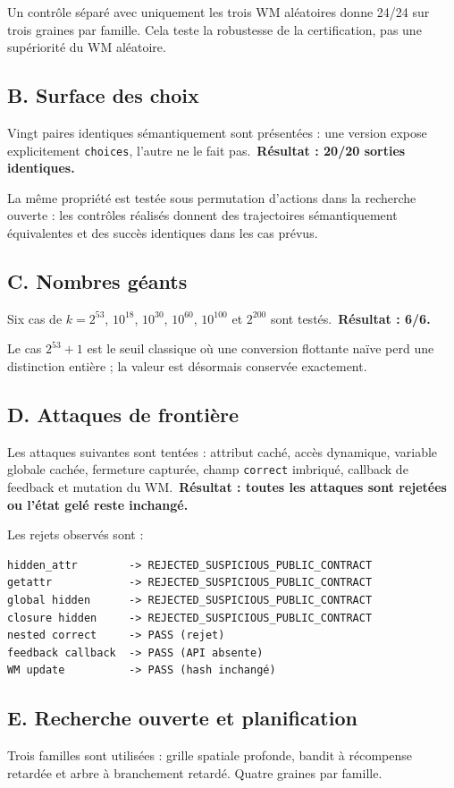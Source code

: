 \documentclass[11pt,a4paper]{article}
\begin{document}
Un contrôle séparé avec uniquement les trois WM aléatoires donne 24/24 sur trois graines par famille. Cela teste la robustesse de la certification, pas une supériorité du WM aléatoire.
\subsection{B. Surface des choix}
Vingt paires identiques sémantiquement sont présentées : une version expose explicitement \texttt{choices}, l'autre ne le fait pas.\
\textbf{Résultat : 20/20 sorties identiques.}

La même propriété est testée sous permutation d'actions dans la recherche ouverte : les contrôles réalisés donnent des trajectoires sémantiquement équivalentes et des succès identiques dans les cas prévus.
\subsection{C. Nombres géants}
Six cas de $k=2^{53}$, $10^{18}$, $10^{30}$, $10^{60}$, $10^{100}$ et $2^{200}$ sont testés.\
\textbf{Résultat : 6/6.}

Le cas $2^{53}+1$ est le seuil classique où une conversion flottante naïve perd une distinction entière ; la valeur est désormais conservée exactement.
\subsection{D. Attaques de frontière}
Les attaques suivantes sont tentées : attribut caché, accès dynamique, variable globale cachée, fermeture capturée, champ \texttt{correct} imbriqué, callback de feedback et mutation du WM.\
\textbf{Résultat : toutes les attaques sont rejetées ou l'état gelé reste inchangé.}

Les rejets observés sont :
\begin{verbatim}
hidden_attr        -> REJECTED_SUSPICIOUS_PUBLIC_CONTRACT
getattr            -> REJECTED_SUSPICIOUS_PUBLIC_CONTRACT
global hidden      -> REJECTED_SUSPICIOUS_PUBLIC_CONTRACT
closure hidden     -> REJECTED_SUSPICIOUS_PUBLIC_CONTRACT
nested correct     -> PASS (rejet)
feedback callback  -> PASS (API absente)
WM update          -> PASS (hash inchangé)
\end{verbatim}
\subsection{E. Recherche ouverte et planification}
Trois familles sont utilisées : grille spatiale profonde, bandit à récompense retardée et arbre à branchement retardé. Quatre graines par famille.
\end{document}
